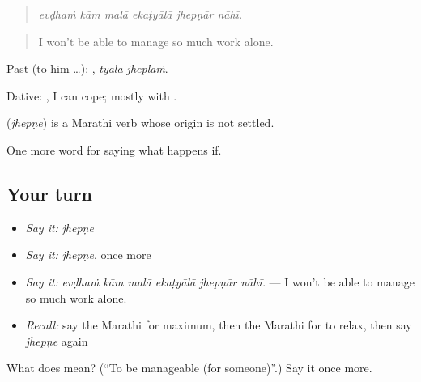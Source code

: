 \begin{quote}
\emph{evḍhaṁ kām malā ekaṭyālā jhepṇār nāhī.}
\end{quote}

\begin{quote}
I won't be able to manage so much work alone.
\end{quote}

Past (to him …):  , \emph{tyālā jheplaṁ}.

Dative:  , I can cope; mostly with .

\begin{cousinweb}
\textbf{} (\emph{jhepṇe}) is a Marathi verb whose origin is not settled.
\end{cousinweb}

\begin{grammarlens}[title={What you've built}]
One more word for saying what happens if.
\end{grammarlens}

\subsection*{Your turn}
\begin{itemize}
\raggedright
  \item \emph{Say it:} \emph{jhepṇe}
  \item \emph{Say it:} \emph{jhepṇe}, once more
  \item \emph{Say it:} \emph{evḍhaṁ kām malā ekaṭyālā jhepṇār nāhī.} — I won't be able to manage so much work alone.
  \item \emph{Recall:} say the Marathi for maximum, then the Marathi for to relax, then say \emph{jhepṇe} again
\end{itemize}

\begin{tcolorbox}[breakable,colback=teal!4,colframe=teal!35!black,title={Before you move on}]
What does  mean? (\textquotedblleft{}To be manageable (for someone)\textquotedblright{}.) Say it once more.
\end{tcolorbox}
